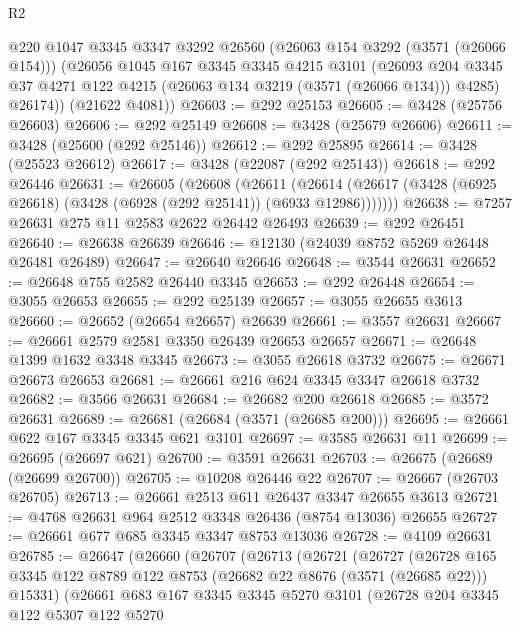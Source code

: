 \begin{lexlean}{R2}
\begin{coremodule}
        @220
        @1047
        @3345
        @3347
        @3292
        @26560
        (@26063 @154 @3292 (@3571 (@26066 @154)))
        (@26056
          @1045
          @167
          @3345
          @3345
          @4215
          @3101
          (@26093 @204 @3345 @37 @4271 @122 @4215 (@26063 @134 @3219 (@3571 (@26066 @134))) @4285)
          @26174))
      (@21622 @4081))
@26603 := @292 @25153
@26605 := @3428 (@25756 @26603)
@26606 := @292 @25149
@26608 := @3428 (@25679 @26606)
@26611 := @3428 (@25600 (@292 @25146))
@26612 := @292 @25895
@26614 := @3428 (@25523 @26612)
@26617 := @3428 (@22087 (@292 @25143))
@26618 := @292 @26446
@26631 := @26605
    (@26608
      (@26611
        (@26614 (@26617 (@3428 (@6925 @26618) (@3428 (@6928 (@292 @25141)) (@6933 @12986)))))))
@26638 := @7257 @26631 @275 @11 @2583 @2622 @26442 @26493
@26639 := @292 @26451
@26640 := @26638 @26639
@26646 := @12130 (@24039 @8752 @5269 @26448 @26481 @26489)
@26647 := @26640 @26646
@26648 := @3544 @26631
@26652 := @26648 @755 @2582 @26440 @3345
@26653 := @292 @26448
@26654 := @3055 @26653
@26655 := @292 @25139
@26657 := @3055 @26655 @3613
@26660 := @26652 (@26654 @26657) @26639
@26661 := @3557 @26631
@26667 := @26661 @2579 @2581 @3350 @26439 @26653 @26657
@26671 := @26648 @1399 @1632 @3348 @3345
@26673 := @3055 @26618 @3732
@26675 := @26671 @26673 @26653
@26681 := @26661 @216 @624 @3345 @3347 @26618 @3732
@26682 := @3566 @26631
@26684 := @26682 @200 @26618
@26685 := @3572 @26631
@26689 := @26681 (@26684 (@3571 (@26685 @200)))
@26695 := @26661 @622 @167 @3345 @3345 @621 @3101
@26697 := @3585 @26631 @11
@26699 := @26695 (@26697 @621)
@26700 := @3591 @26631
@26703 := @26675 (@26689 (@26699 @26700))
@26705 := @10208 @26446 @22
@26707 := @26667 (@26703 @26705)
@26713 := @26661 @2513 @611 @26437 @3347 @26655 @3613
@26721 := @4768 @26631 @964 @2512 @3348 @26436 (@8754 @13036) @26655
@26727 := @26661 @677 @685 @3345 @3347 @8753 @13036
@26728 := @4109 @26631
@26785 := @26647
    (@26660
      (@26707
        (@26713
          (@26721
            (@26727
              (@26728
                @165
                @3345
                @122
                @8789
                @122
                @8753
                (@26682 @22 @8676 (@3571 (@26685 @22)))
                @15331)
              (@26661
                @683
                @167
                @3345
                @3345
                @5270
                @3101
                (@26728
                  @204
                  @3345
                  @122
                  @5307
                  @122
                  @5270

\end{coremodule}
\end{lexlean}
